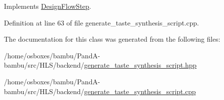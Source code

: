 Implements \hyperlink{classDesignFlowStep_a1783abe0c1d162a52da1e413d5d1ef05}{Design\+Flow\+Step}.



Definition at line 63 of file generate\+\_\+taste\+\_\+synthesis\+\_\+script.\+cpp.



The documentation for this class was generated from the following files\+:\begin{DoxyCompactItemize}
\item 
/home/osboxes/bambu/\+Pand\+A-\/bambu/src/\+H\+L\+S/backend/\hyperlink{generate__taste__synthesis__script_8hpp}{generate\+\_\+taste\+\_\+synthesis\+\_\+script.\+hpp}\item 
/home/osboxes/bambu/\+Pand\+A-\/bambu/src/\+H\+L\+S/backend/\hyperlink{generate__taste__synthesis__script_8cpp}{generate\+\_\+taste\+\_\+synthesis\+\_\+script.\+cpp}\end{DoxyCompactItemize}
